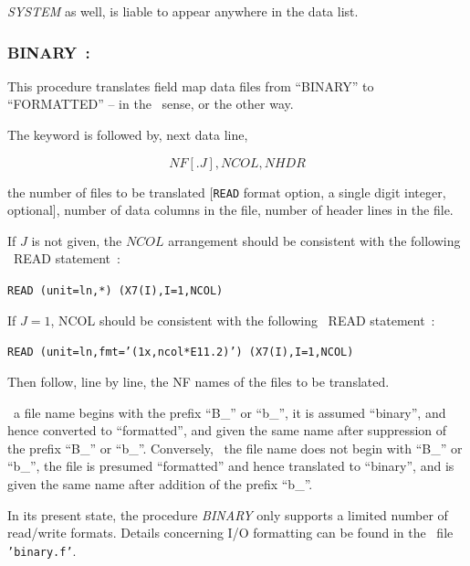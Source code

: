 \medskip

\noindent \textsl{SYSTEM} as well,  is liable to appear anywhere in the data list.



\newpage

\subsubsection*{BINARY~: \BINARYTitl}  \label{BINARY} 
\medskip

This procedure translates field map data files from ``BINARY'' to 
``FORMATTED'' -- in the \FORTRAN\ sense, or the other way.

\bigskip

\noindent The keyword is followed by, next data line,  

$$NF[.J], NCOL, NHDR $$

\noindent  the number of files to be translated [\texttt{READ} format option, a single digit integer, optional],  
number of data columns in the file, 
number of header lines in the file.  

\medskip

\noindent If $J$ is not given, the $NCOL$ arrangement should be consistent with the following \FORTRAN\ READ statement~: 

       {\tt     READ (unit=ln,*) (X7(I),I=1,NCOL)}

\medskip

\noindent If $J=1$, NCOL should be consistent with the following \FORTRAN\ READ statement~: 

       {\tt     READ (unit=ln,fmt='(1x,ncol*E11.2)') (X7(I),I=1,NCOL)}

 
\medskip

\noindent Then follow, line by line, the NF names of the files to be translated.

\medskip

\noindent \If\ a file name begins with the prefix ``B\_'' or ``b\_'', it is 
assumed ``binary'', and hence converted to ``formatted'', and given 
the same name after suppression of the prefix ``B\_'' or ``b\_''. Conversely, 
\Iff\ the file name does not begin with ``B\_'' or ``b\_'', the file is 
presumed ``formatted'' and hence translated to ``binary'', and is 
given the same name after addition of the prefix ``b\_''.

\medskip

\noindent In its present state, the procedure \textsl{BINARY} 
only supports a limited number of read/write formats. Details concerning I/O formatting can be found 
in the \FORTRAN\ file \texttt{'binary.f'}.


